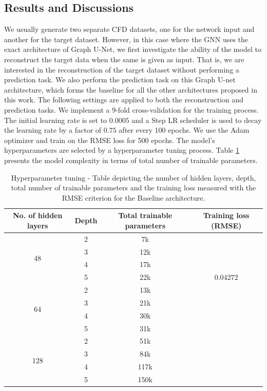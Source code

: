 \subsection{Results and Discussions}
We usually generate two separate CFD datasets, one for the network input and another for the target dataset. However, in this case where the GNN uses the exact architecture of Graph U-Net, we first investigate the ability of the model to reconstruct the target data when the same is given as input. That is, we are interested in the reconstruction of the target dataset without performing a prediction task. We also perform the prediction task on this Graph U-net architecture, which forms the baseline for all the other architectures proposed in this work. The following settings are applied to both the reconstruction and prediction tasks. We implement a 9-fold cross-validation for the training process. The initial learning rate is set to $0.0005$ and a Step LR scheduler is used to decay the learning rate by a factor of $0.75$ after every 100 epochs. We use the Adam optimizer and train on the \gls{RMSE} loss for 500 epochs. The model's hyperparameters are selected by a hyperparameter tuning process. Table \ref{table:complex} presents the model complexity in terms of total number of trainable parameters. \begin{table}[ht]
    \centering
    \caption{Hyperparameter tuning - Table depicting the number of hidden layers, depth, total number of trainable parameters and the training loss measured with the RMSE criterion for the Baseline architecture.}
    \label{table:complex}
    \begin{tabular}{|c|c|c|c|}
    \hline
    \textbf{No. of hidden layers} & \textbf{Depth} & \textbf{Total trainable parameters} & \textbf{Training loss (RMSE)} \\
    \hline
    \multirow{4}{*}{48} & 2 & 7k &  \\
    \cline{2-4}
                        & 3 & 12k &  \\
    \cline{2-4}
                        & 4 & 17k & \\
    \cline{2-4}
                        & 5 & 22k &  0.04272\\
    \hline
    \multirow{4}{*}{64} & 2 & 13k & \\
    \cline{2-4}
                        & 3 & 21k &  \\
    \cline{2-4}
                        & 4 & 30k &  \\
    \cline{2-4}
                        & 5 & 31k &  \\
    \hline
    \multirow{4}{*}{128} & 2 & 51k& \\
    \cline{2-4}
                         & 3 & 84k &  \\
    \cline{2-4}
                         & 4 & 117k &   \\
    \cline{2-4}
                         & 5 & 150k &  \\
    \hline
    \end{tabular}
    
    \end{table}

